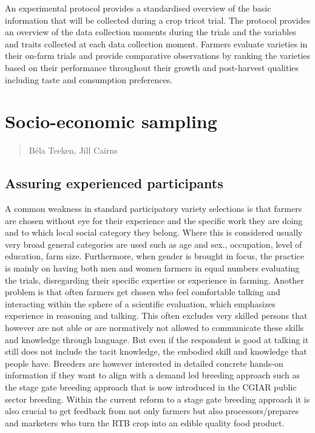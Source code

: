 \documentclass[
]{book}
\begin{document}
An experimental protocol provides a standardised overview of the basic information that will be collected during a crop tricot trial. The protocol provides an overview of the data collection moments during the trials and the variables and traits collected at each data collection moment. Farmers evaluate varieties in their on-farm trials and provide comparative observations by ranking the varieties based on their performance throughout their growth and post-harvest qualities including taste and consumption preferences.

\chapter{Socio-economic sampling}\label{socio-economic-sampling}

\begin{quote}
Béla Teeken, Jill Cairns
\end{quote}

\section{Assuring experienced participants}\label{assuring-experienced-participants}

A common weakness in standard participatory variety selections is that farmers are chosen without eye for their experience and the specific work they are doing and to which local social category they belong. Where this is considered usually very broad general categories are used such as age and sex., occupation, level of education, farm size. Furthermore, when gender is brought in focus, the practice is mainly on having both men and women farmers in equal numbers evaluating the trials, disregarding their specific expertise or experience in farming. Another problem is that often farmers get chosen who feel comfortable talking and interacting within the sphere of a scientific evaluation, which emphasizes experience in reasoning and talking. This often excludes very skilled persons that however are not able or are normatively not allowed to communicate these skills and knowledge through language. But even if the respondent is good at talking it still does not include the tacit knowledge, the embodied skill and knowledge that people have. Breeders are however interested in detailed concrete hands-on information if they want to align with a demand led breeding approach such as the stage gate breeding approach that is now introduced in the CGIAR public sector breeding. Within the current reform to a stage gate breeding approach it is also crucial to get feedback from not only farmers but also processors/prepares and marketers who turn the RTB crop into an edible quality food product.
\end{document}
